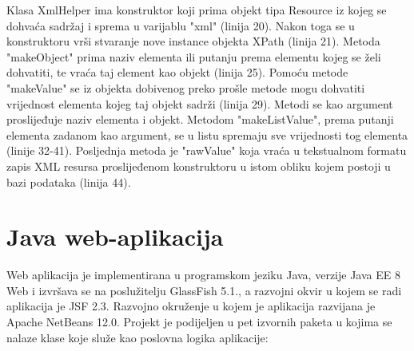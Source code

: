 \documentclass{foi}
\begin{document}
Klasa XmlHelper ima konstruktor koji prima objekt tipa Resource iz kojeg se dohvaća sadržaj i sprema u varijablu "xml" (linija 20). Nakon toga se u konstruktoru vrši stvaranje nove instance objekta XPath (linija 21). Metoda "makeObject" prima naziv elementa ili putanju prema elementu kojeg se želi dohvatiti, te vraća taj element kao objekt (linija 25). Pomoću metode "makeValue" se iz objekta dobivenog preko prošle metode mogu dohvatiti vrijednost elementa kojeg taj objekt sadrži (linija 29). Metodi se kao argument proslijeđuje naziv elementa i objekt. Metodom "makeListValue", prema putanji elementa zadanom kao argument, se u listu spremaju sve vrijednosti tog elementa (linije 32-41). Posljednja metoda je "rawValue" koja vraća u tekstualnom formatu zapis XML resursa proslijeđenom konstruktoru u istom obliku kojem postoji u bazi podataka (linija 44).

\section{Java web-aplikacija}

Web aplikacija je implementirana u programskom jeziku Java, verzije Java EE 8 Web i izvršava se na poslužitelju GlassFish 5.1., a razvojni okvir u kojem se radi aplikacija je JSF 2.3. Razvojno okruženje u kojem je aplikacija razvijana je Apache NetBeans 12.0. Projekt je podijeljen u pet izvornih paketa u kojima se nalaze klase koje služe kao poslovna logika aplikacije:
\end{document}

